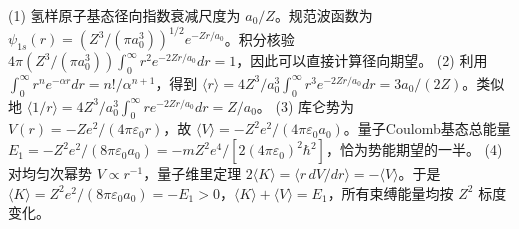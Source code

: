 (1) 氢样原子基态径向指数衰减尺度为 \(a_0/Z\)。规范波函数为 \(\psi_{1s}(r)=(Z^3/(\pi a_0^3))^{1/2}e^{-Zr/a_0}\)。积分核验 \(4\pi(Z^3/(\pi a_0^3))\int_0^\infty r^2e^{-2Zr/a_0}dr=1\)，因此可以直接计算径向期望。
(2) 利用 \(\int_0^\infty r^ne^{-\alpha r}dr=n!/\alpha^{n+1}\)，得到 \(\langle r\rangle=4Z^3/a_0^3\int_0^\infty r^3e^{-2Zr/a_0}dr=3a_0/(2Z)\)。类似地 \(\langle1/r\rangle=4Z^3/a_0^3\int_0^\infty r e^{-2Zr/a_0}dr=Z/a_0\)。
(3) 库仑势为 \(V(r)=-Ze^2/(4\pi\varepsilon_0r)\)，故 \(\langle V\rangle=-Z^2e^2/(4\pi\varepsilon_0a_0)\)。量子Coulomb基态总能量 \(E_1=-Z^2e^2/(8\pi\varepsilon_0a_0)=-mZ^2e^4/[2(4\pi\varepsilon_0)^2\hbar^2]\)，恰为势能期望的一半。
(4) 对均匀次幂势 \(V\propto r^{-1}\)，量子维里定理 \(2\langle K\rangle=\langle r\,dV/dr\rangle=-\langle V\rangle\)。于是 \(\langle K\rangle=Z^2e^2/(8\pi\varepsilon_0a_0)=-E_1>0\)，\(\langle K\rangle+\langle V\rangle=E_1\)，所有束缚能量均按 \(Z^2\) 标度变化。
